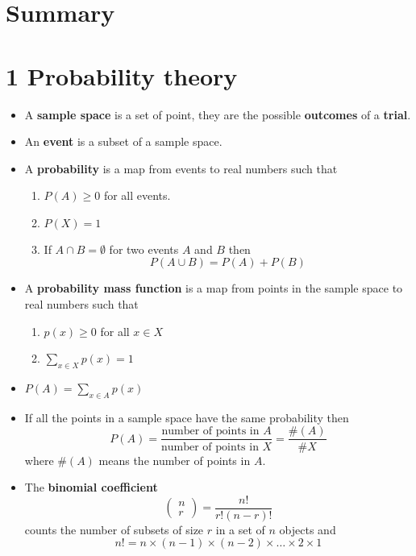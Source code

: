 
\ifind
\section*{Summary}
\else
\section*{1 Probability theory}
\fi

\begin{itemize}
\item A \textbf{sample space} is a set of point, they are the possible \textbf{outcomes} of a \textbf{trial}.
\item An \textbf{event} is a subset of a sample space.
\item A \textbf{probability} is a map from events to real numbers such that
  \begin{enumerate}
    \item $P(A)\ge 0$ for all events.
    \item $P(X)=1$
    \item If $A\cap B=\emptyset$ for two events $A$ and $B$ then 
      \begin{equation}
        P(A\cup B)=P(A)+P(B)
      \end{equation}
\end{enumerate}
\item A \textbf{probability mass function} is a map from points in the sample space to real numbers such that
  \begin{enumerate}
\item $p(x)\ge 0$ for all $x\in X$
\item $\sum_{x\in X} p(x)=1$
  \end{enumerate}
\item $P(A)=\sum_{x\in A}p(x)$
\item If all the points in a sample space have the same probability then
  \begin{equation}
P(A)=\frac{\mbox{number of points in }A}{\mbox{number of points in }X}=\frac{\#(A)}{\#{X}}
  \end{equation}
  where $\#(A)$ means the number of points in $A$.
  \item The \textbf{binomial coefficient}
\begin{equation}
\left(\begin{array}{c}n\\r\end{array}\right)=\frac{n!}{r!(n-r)!}
\end{equation}
counts the number of subsets of size $r$ in a set of $n$ objects and 
\begin{equation}
n!=n\times (n-1)\times (n-2)\times \ldots \times 2 \times 1
\end{equation}
\end{itemize}

